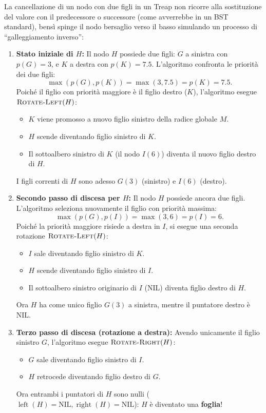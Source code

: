 La cancellazione di un nodo con due figli in un Treap non ricorre alla sostituzione del valore con il predecessore o successore (come avverrebbe in un BST standard), bens\`i spinge il nodo bersaglio verso il basso simulando un processo di ``galleggiamento inverso'':
\begin{enumerate}
    \item \textbf{Stato iniziale di $H$:}
    Il nodo $H$ possiede due figli: $G$ a sinistra con $p(G) = 3$, e $K$ a destra con $p(K) = 7.5$.
    L'algoritmo confronta le priorit\`a dei due figli:
    \begin{equation}
      \max(p(G), p(K)) = \max(3, 7.5) = p(K) = 7.5.
    \end{equation}
    Poich\'e il figlio con priorit\`a maggiore \`e il figlio destro ($K$), l'algoritmo esegue $\textsc{Rotate-Left}(H)$:
    \begin{itemize}
        \item $K$ viene promosso a nuovo figlio sinistro della radice globale $M$.
        \item $H$ scende diventando figlio sinistro di $K$.
        \item Il sottoalbero sinistro di $K$ (il nodo $I(6)$) diventa il nuovo figlio destro di $H$.
    \end{itemize}
    I figli correnti di $H$ sono adesso $G(3)$ (sinistro) e $I(6)$ (destro).
    
    \item \textbf{Secondo passo di discesa per $H$:}
    Il nodo $H$ possiede ancora due figli. L'algoritmo seleziona nuovamente il figlio con priorit\`a massima:
    \begin{equation}
      \max(p(G), p(I)) = \max(3, 6) = p(I) = 6.
    \end{equation}
    Poich\'e la priorit\`a maggiore risiede a destra in $I$, si esegue una seconda rotazione $\textsc{Rotate-Left}(H)$:
    \begin{itemize}
        \item $I$ sale diventando figlio sinistro di $K$.
        \item $H$ scende diventando figlio sinistro di $I$.
        \item Il sottoalbero sinistro originario di $I$ ($\mathrm{NIL}$) diventa figlio destro di $H$.
    \end{itemize}
    Ora $H$ ha come unico figlio $G(3)$ a sinistra, mentre il puntatore destro \`e $\mathrm{NIL}$.
    
    \item \textbf{Terzo passo di discesa (rotazione a destra):}
    Avendo unicamente il figlio sinistro $G$, l'algoritmo esegue $\textsc{Rotate-Right}(H)$:
    \begin{itemize}
        \item $G$ sale diventando figlio sinistro di $I$.
        \item $H$ retrocede diventando figlio destro di $G$.
    \end{itemize}
    Ora entrambi i puntatori di $H$ sono nulli ($\operatorname{left}(H) = \mathrm{NIL}, \operatorname{right}(H) = \mathrm{NIL}$): $H$ \`e diventato una \textbf{foglia}!
    

\end{enumerate}
